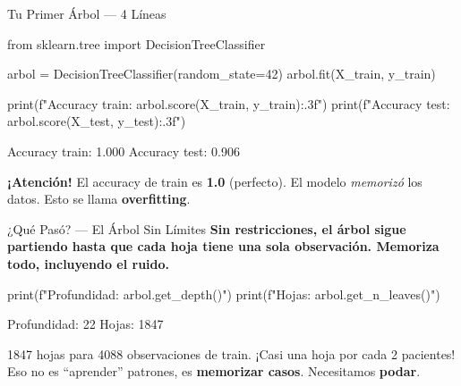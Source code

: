 \documentclass[aspectratio=169, 11pt]{beamer}
\begin{document}
\begin{frame}[fragile,shrink=18]{Tu Primer Árbol --- 4 Líneas}
  \vspace{-6pt}
  \begin{pyblock}
from sklearn.tree import DecisionTreeClassifier

arbol = DecisionTreeClassifier(random_state=42)
arbol.fit(X_train, y_train)

print(f"Accuracy train: {arbol.score(X_train, y_train):.3f}")
print(f"Accuracy test:  {arbol.score(X_test, y_test):.3f}")
  \end{pyblock}

  \vspace{4pt}
  \begin{outputblock}
Accuracy train: 1.000
Accuracy test:  0.906
  \end{outputblock}

  \vspace{4pt}
  {\scriptsize\color{arcaRed}
    \faExclamationTriangle\hspace{4pt}\textbf{¡Atención!} El accuracy de train
    es \textbf{1.0} (perfecto). El modelo \textit{memorizó} los datos.
    Esto se llama \textbf{overfitting}.}
\end{frame}

\begin{frame}[fragile,shrink=10]{¿Qué Pasó? --- El Árbol Sin Límites}
  \vspace{-4pt}
  {\footnotesize\color{arcaDark}\bfseries
    Sin restricciones, el árbol sigue partiendo hasta que cada hoja
    tiene \textbf{una sola observación}. Memoriza todo, incluyendo el ruido.}

  \vspace{6pt}
  \begin{pyblock}
print(f"Profundidad: {arbol.get_depth()}")
print(f"Hojas:       {arbol.get_n_leaves()}")
  \end{pyblock}

  \vspace{4pt}
  \begin{outputblock}
Profundidad: 22
Hojas:       1847
  \end{outputblock}

  \vspace{4pt}
  {\scriptsize\color{textMuted}
    \faLightbulb\hspace{4pt} 1847 hojas para 4088 observaciones de train.
    ¡Casi una hoja por cada 2 pacientes! Eso no es ``aprender'' patrones,
    es \textbf{memorizar casos}. Necesitamos \textbf{podar}.}
\end{frame}
\end{document}
